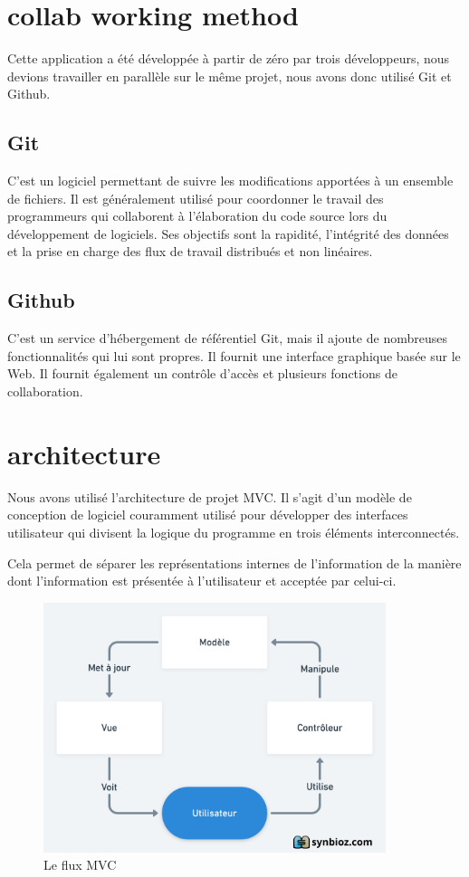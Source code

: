\documentclass[a4paper]{report}
\begin{document}
	\section{collab working method}
		Cette application a été développée à partir de zéro par trois développeurs, nous devions travailler en parallèle sur le même projet, nous avons donc utilisé Git et Github.

		\subsection*{Git} C'est un logiciel permettant de suivre les modifications apportées à un ensemble de fichiers. Il est généralement utilisé pour coordonner le travail des programmeurs qui collaborent à l'élaboration du code source lors du développement de logiciels. Ses objectifs sont la rapidité, l'intégrité des données et la prise en charge des flux de travail distribués et non linéaires.

		\subsection*{Github} C'est un service d'hébergement de référentiel Git, mais il ajoute de nombreuses fonctionnalités qui lui sont propres. Il fournit une interface graphique basée sur le Web. Il fournit également un contrôle d'accès et plusieurs fonctions de collaboration.
	\section{architecture} %
		Nous avons utilisé l'architecture de projet MVC. Il s'agit d'un modèle de conception de logiciel couramment utilisé pour développer des interfaces utilisateur qui divisent la logique du programme en trois éléments interconnectés.

Cela permet de séparer les représentations internes de l'information de la manière dont l'information est présentée à l'utilisateur et acceptée par celui-ci.
\begin{figure}[!h]
  \center
  \includegraphics[width=10cm]{mvc.png}
  \caption{Le flux MVC}
  \label{fig:fluxmvc}
\end{figure}
\end{document}
